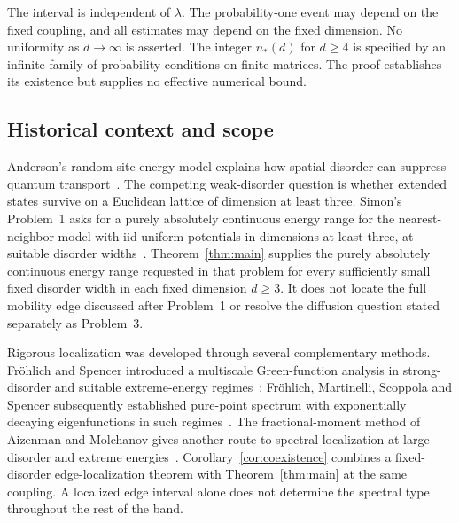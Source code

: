 The interval is independent of $\lambda$. The probability-one event
may depend on the fixed coupling, and all estimates may depend on the
fixed dimension. No uniformity as $d\to\infty$ is asserted. The
integer $n_*(d)$ for $d\ge4$ is specified by an infinite family of
probability conditions on finite matrices. The proof establishes its
existence but supplies no effective numerical bound.

\subsection{Historical context and scope}

Anderson's random-site-energy model explains how spatial disorder can
suppress quantum transport~\cite{Anderson1958}. The competing
weak-disorder question is whether extended states survive on a
Euclidean lattice of dimension at least three. Simon's Problem~1
asks for a purely absolutely continuous energy range for the
nearest-neighbor model with iid uniform potentials in dimensions at
least three, at suitable disorder widths~\cite{Simon2000}.
Theorem~\ref{thm:main} supplies the purely absolutely continuous
energy range requested in that problem for every sufficiently small
fixed disorder width in each fixed dimension $d\ge3$. It does not
locate the full mobility edge discussed after Problem~1 or resolve
the diffusion question stated separately as Problem~3.

Rigorous localization was developed through several complementary
methods. Fr\"ohlich and Spencer introduced a multiscale Green-function
analysis in strong-disorder and suitable extreme-energy
regimes~\cite{FrohlichSpencer1983}; Fr\"ohlich, Martinelli, Scoppola
and Spencer subsequently established pure-point spectrum with
exponentially decaying eigenfunctions in such
regimes~\cite{FMSS1985}. The fractional-moment method of Aizenman
and Molchanov gives another route to spectral localization at large
disorder and extreme energies~\cite{AizenmanMolchanov1993}.
Corollary~\ref{cor:coexistence} combines a fixed-disorder
edge-localization theorem with Theorem~\ref{thm:main} at the same
coupling. A localized edge interval alone does not determine the
spectral type throughout the rest of the band.

